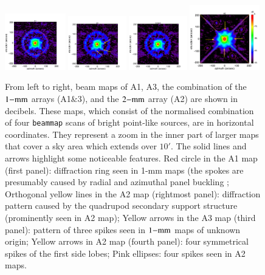 \documentclass[traditionalabstract]{aa}
\newcommand{\rev}[1]{#1}
\begin{document}
{\begin{figure}[!thbp] 
\begin{center}
\includegraphics[clip=true, trim={0.1cm, 0cm, 3cm, 2cm},width=0.235\textwidth]{Figures/Lobe_map_Combo_1_dB_16.pdf}
\includegraphics[clip=true, trim={1cm, 0cm, 3cm, 2cm},width=0.225\textwidth]{Figures/Lobe_map_Combo_3_dB_16.pdf}
\includegraphics[clip=true, trim={1cm, 0cm, 3cm, 2cm},width=0.225\textwidth]{Figures/Lobe_map_Combo_1MM_dB_16.pdf}
\includegraphics[clip=true, trim={1cm, 0cm, 0cm, 1cm},width=0.27\textwidth]{Figures/Lobe_map_Combo_2_dB_bar_16.pdf}
\caption[Noticeable features of NIKA2 beam pattern.]{From left
to right, beam maps of A1, A3, the combination of the $1\rm{-mm}$ arrays (A1$\&$3), and the
$2\rm{-mm}$ array (A2) are shown in decibels. These maps, which
consist of the normalised combination of four {\tt beammap} scans of
bright point-like sources, are in horizontal coordinates. {\rev They
represent a zoom in the inner part of larger maps that cover a
sky area which extends over $10'$.} 
The solid lines and arrows highlight some noticeable features.
Red circle in the A1 map (first panel): diffraction ring seen in 1-mm maps
(the spokes are presumably caused by radial and azimuthal panel
buckling \citep{Greve2010}; Orthogonal yellow lines in the A2 map
(rightmost panel): diffraction pattern caused by the quadrupod
secondary support structure (prominently
seen in A2 map); Yellow arrows in the A3 map (third panel):
pattern of three spikes seen in $1\rm{-mm}$ maps of unknown origin; Yellow
arrows in A2 map (fourth panel): four symmetrical spikes of the
first side lobes; Pink ellipses: four spikes seen in A2 maps.}
\label{fig:features}
\end{center}
\end{figure}

}
\end{document}
